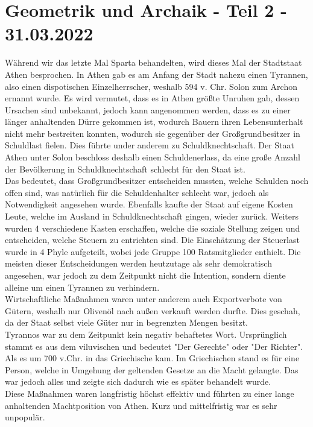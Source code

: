 \documentclass{article}
\begin{document}
	\section{Geometrik und Archaik - Teil 2 - 31.03.2022}

	Während wir das letzte Mal Sparta behandelten, wird dieses Mal der Stadtstaat Athen besprochen. In Athen gab es am Anfang der Stadt nahezu einen Tyrannen, also einen dispotischen Einzelherrscher, weshalb 594 v. Chr. Solon zum Archon ernannt wurde. Es wird vermutet, dass es in Athen größte Unruhen gab, dessen Ursachen sind unbekannt, jedoch kann angenommen werden, dass es zu einer länger anhaltenden Dürre gekommen ist, wodurch Bauern ihren Lebensunterhalt nicht mehr bestreiten konnten, wodurch sie gegenüber der Großgrundbesitzer in Schuldlast fielen. Dies führte under anderem zu Schuldknechtschaft. Der Staat Athen unter Solon beschloss deshalb einen Schuldenerlass, da eine große Anzahl der Bevölkerung in Schuldknechtschaft schlecht für den Staat ist. \\
	Das bedeutet, dass Großgrundbesitzer entscheiden mussten, welche Schulden noch offen sind, was natürlich für die Schuldenhalter schlecht war, jedoch als Notwendigkeit angesehen wurde. Ebenfalls kaufte der Staat auf eigene Kosten Leute, welche im Ausland in Schuldknechtschaft gingen, wieder zurück. Weiters wurden 4 verschiedene Kasten erschaffen, welche die soziale Stellung zeigen und entscheiden, welche Steuern zu entrichten sind. Die Einschätzung der Steuerlast wurde in 4 Phyle aufgeteilt, wobei jede Gruppe 100 
	Ratsmitglieder enthielt. Die meisten dieser Entscheidungen werden heutzutage als sehr demokratisch angesehen, war jedoch zu dem Zeitpunkt nicht die Intention, sondern diente alleine um einen Tyrannen zu verhindern. \\
	Wirtschaftliche Maßnahmen waren unter anderem auch Exportverbote von Gütern, weshalb nur Olivenöl nach außen verkauft werden durfte. Dies geschah, da der Staat selbst viele Güter nur in begrenzten Mengen besitzt. \\
	Tyrannos war zu dem Zeitpunkt kein negativ behaftetes Wort. Ursprünglich stammt es aus dem viluvischen und bedeutet "Der Gerechte" oder "Der Richter". Als es um 700 v.Chr. in das Griechische kam. Im Griechischen stand es für eine Person, welche in Umgehung der geltenden Gesetze an die Macht gelangte. Das war jedoch alles und zeigte sich dadurch wie es später behandelt wurde. \\
	Diese Maßnahmen waren langfristig höchst effektiv und führten zu einer lange anhaltenden Machtposition von Athen. Kurz und mittelfristig war es sehr unpopulär. \\
\end{document}

